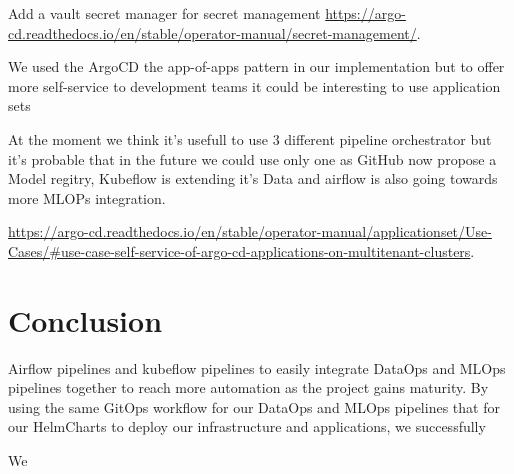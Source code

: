 Add a vault secret manager for secret management \url{https://argo-cd.readthedocs.io/en/stable/operator-manual/secret-management/}.

We used the ArgoCD the app-of-apps pattern in our implementation but to offer more self-service to development teams it could be interesting to use application sets

At the moment we think it's usefull to use 3 different pipeline orchestrator but it's probable that in the future we could use only one as
GitHub now propose a Model regitry, Kubeflow is extending it's Data and airflow is also going towards more MLOPs integration.

\url{https://argo-cd.readthedocs.io/en/stable/operator-manual/applicationset/Use-Cases/#use-case-self-service-of-argo-cd-applications-on-multitenant-clusters}.


\section{Conclusion}\label{sec:conclusion}
Airflow pipelines and kubeflow pipelines to easily integrate DataOps and MLOps pipelines together to reach more automation as the project gains maturity.
By using the same GitOps workflow for our DataOps and MLOps pipelines that for our HelmCharts to deploy our infrastructure and applications,
we successfully

We